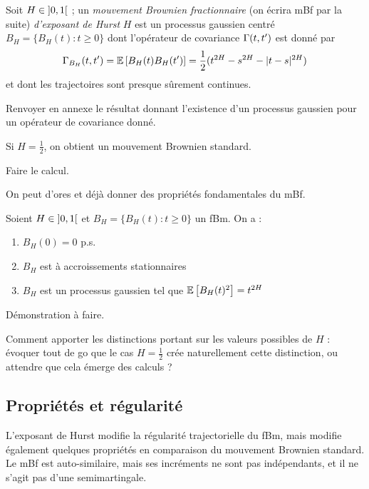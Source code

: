 \begin{definition}
  Soit $H \in \left]0,1\right[$ ; un \emph{mouvement Brownien
    fractionnaire} (on écrira mBf par la suite) \emph{d'exposant de
    Hurst} $H$ est un processus gaussien centré
  $B_H = \{B_H(t) : t \geq 0\}$ dont l'opérateur de covariance
  $\Gamma(t,t')$ est donné par
  \begin{equation}
    \Gamma_{B_H}(t,t') = \mathbb{E}\left[B_H(t)B_H(t')\right] = \frac{1}{2}(t^{2H}-s^{2H}-|t-s|^{2H})
  \end{equation}
  et dont les trajectoires sont presque sûrement continues.
\end{definition}

\begin{alert}
  Renvoyer en annexe le résultat donnant l'existence d'un processus
  gaussien pour un opérateur de covariance donné.
\end{alert}

\begin{remarque}
  Si $H=\frac{1}{2}$, on obtient un mouvement Brownien standard.
  \begin{alert}
    Faire le calcul.
  \end{alert}
\end{remarque}

On peut d'ores et déjà donner des propriétés fondamentales du mBf.

\begin{proposition}
  Soient $H\in\left]0,1\right[$ et $B_H = \{B_H(t) : t\geq 0\}$ un fBm. On
  a :
  \begin{enumerate}
  \item $B_H(0) = 0$ p.s.
  \item $B_H$ est à accroissements stationnaires
  \item $B_H$ est un processus gaussien tel que $\mathbb{E}\left[B_H(t)^2\right] = t^{2H}$
  \end{enumerate}
\end{proposition}
\begin{alert}
  Démonstration à faire.
\end{alert}

\begin{question}
  Comment apporter les distinctions portant sur les valeurs possibles
  de $H$ : évoquer tout de go que le cas $H=\frac{1}{2}$ crée
  naturellement cette distinction, ou attendre que cela émerge des
  calculs ?
\end{question}

\subsection{Propriétés et régularité}
L'exposant de Hurst modifie la régularité trajectorielle du fBm, mais
modifie également quelques propriétés en comparaison du mouvement
Brownien standard. Le mBf est auto-similaire, mais ses incréments ne
sont pas indépendants, et il ne s'agit pas d'une semimartingale.

